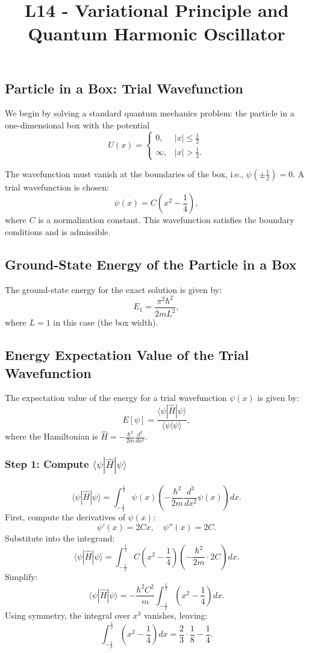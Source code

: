 \documentclass[a4paper,12pt]{article}
\begin{document}
\title{L14 - Variational Principle and Quantum Harmonic Oscillator}
\author{}
\date{}
\maketitle
\begin{multicols}{2}

\section{Particle in a Box: Trial Wavefunction}

We begin by solving a standard quantum mechanics problem: the particle in a one-dimensional box with the potential
\[
U(x) = 
\begin{cases} 
0, & |x| \leq \frac{1}{2} \\ 
\infty, & |x| > \frac{1}{2}.
\end{cases}
\]

The wavefunction must vanish at the boundaries of the box, i.e., \( \psi\left(\pm \frac{1}{2}\right) = 0 \). A trial wavefunction is chosen:
\[
\psi(x) = C\left(x^2 - \frac{1}{4}\right),
\]
where \( C \) is a normalization constant. This wavefunction satisfies the boundary conditions and is admissible.

\subsection*{Ground-State Energy of the Particle in a Box}
The ground-state energy for the exact solution is given by:
\[
E_1 = \frac{\pi^2 \hbar^2}{2mL^2},
\]
where \( L = 1 \) in this case (the box width).

\subsection*{Energy Expectation Value of the Trial Wavefunction}
The expectation value of the energy for a trial wavefunction \( \psi(x) \) is given by:
\[
E[\psi] = \frac{\langle \psi | \hat{H} | \psi \rangle}{\langle \psi | \psi \rangle},
\]
where the Hamiltonian is \( \hat{H} = -\frac{\hbar^2}{2m}\frac{d^2}{dx^2} \). 

\subsubsection*{Step 1: Compute \( \langle \psi | \hat{H} | \psi \rangle \)}
\[
\langle \psi | \hat{H} | \psi \rangle = \int_{-\frac{1}{2}}^{\frac{1}{2}} \psi(x) \left(-\frac{\hbar^2}{2m} \frac{d^2}{dx^2}\psi(x)\right) dx.
\]
First, compute the derivatives of \( \psi(x) \):
\[
\psi'(x) = 2Cx, \quad \psi''(x) = 2C.
\]
Substitute into the integrand:
\[
\langle \psi | \hat{H} | \psi \rangle = \int_{-\frac{1}{2}}^{\frac{1}{2}} C\left(x^2 - \frac{1}{4}\right) \left(-\frac{\hbar^2}{2m} \cdot 2C\right) dx.
\]
Simplify:
\[
\langle \psi | \hat{H} | \psi \rangle = -\frac{\hbar^2 C^2}{m} \int_{-\frac{1}{2}}^{\frac{1}{2}} \left(x^2 - \frac{1}{4}\right) dx.
\]
Using symmetry, the integral over \( x^3 \) vanishes, leaving:
\[
\int_{-\frac{1}{2}}^{\frac{1}{2}} \left(x^2 - \frac{1}{4}\right) dx = \frac{2}{3}\cdot\frac{1}{8} - \frac{1}{4}.
\]


\end{multicols}
\end{document}
